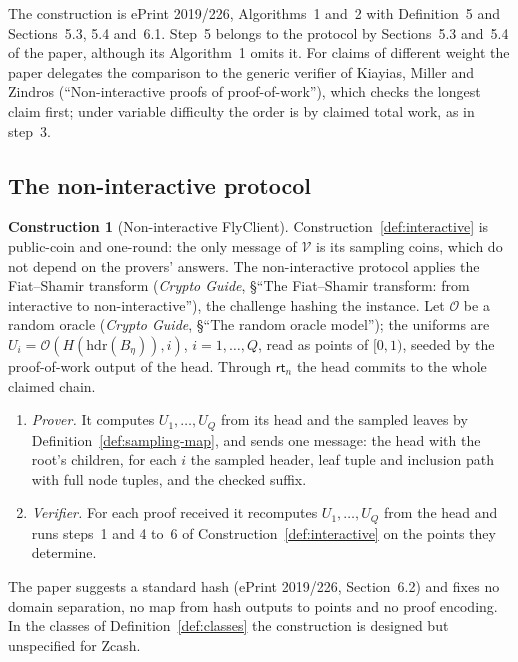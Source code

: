 \documentclass[11pt,a4paper]{article}
\theoremstyle{definition}
\newtheorem{construction}[theorem]{Construction}
\newcommand{\Ver}{\mathcal{V}}
\begin{document}
The construction is ePrint 2019/226, Algorithms~1 and~2 with Definition~5
and Sections~5.3, 5.4 and~6.1. Step~5 belongs to the protocol by
Sections~5.3 and~5.4 of the paper, although its Algorithm~1 omits it. For
claims of different weight the paper delegates the comparison to the generic
verifier of Kiayias, Miller and Zindros (``Non-interactive proofs of
proof-of-work''), which checks the longest claim first; under variable
difficulty the order is by claimed total work, as in step~3.

\subsection{The non-interactive protocol}\label{sec:protocol-fs}

\begin{construction}[Non-interactive FlyClient]\label{def:noninteractive}
Construction~\ref{def:interactive} is public-coin and one-round: the only
message of $\Ver$ is its sampling coins, which do not depend on the
provers' answers. The non-interactive protocol applies the Fiat--Shamir
transform (\emph{Crypto Guide}, \S``The Fiat--Shamir transform: from
interactive to non-interactive''), the challenge hashing the instance. Let
$\mathcal{O}$ be a random oracle (\emph{Crypto Guide}, \S``The random oracle
model''); the uniforms are $U_i=\mathcal{O}(H(\mathrm{hdr}(B_\eta)),i)$,
$i=1,\dots,Q$, read as points of $[0,1)$, seeded by the proof-of-work output
of the head. Through $\mathsf{rt}_n$ the head commits to the whole claimed
chain.
\begin{enumerate}
\item \emph{Prover.} It computes $U_1,\dots,U_Q$ from its head and the
  sampled leaves by Definition~\ref{def:sampling-map}, and sends one message:
  the head with the root's children, for each $i$ the sampled header, leaf
  tuple and inclusion path with full node tuples, and the checked suffix.
\item \emph{Verifier.} For each proof received it recomputes
  $U_1,\dots,U_Q$ from the head and runs steps~1 and 4 to~6 of
  Construction~\ref{def:interactive} on the points they determine.
\end{enumerate}
\end{construction}

The paper suggests a standard hash (ePrint 2019/226, Section~6.2) and fixes
no domain separation, no map from hash outputs to points and no proof
encoding. In the classes of Definition~\ref{def:classes} the construction is
designed but unspecified for Zcash.
\end{document}
